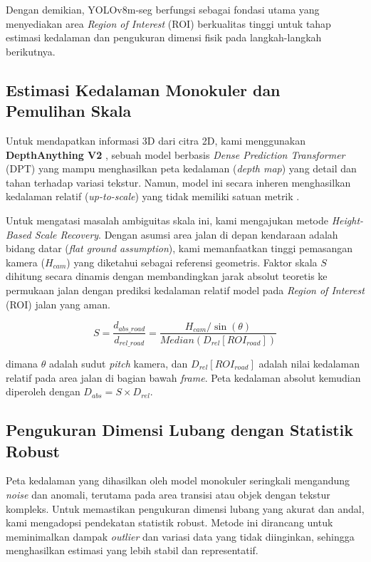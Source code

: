 \documentclass{iopjournal}
\begin{document}
Dengan demikian, YOLOv8m-seg berfungsi sebagai fondasi utama yang menyediakan area \textit{Region of Interest} (ROI) berkualitas tinggi untuk tahap estimasi kedalaman dan pengukuran dimensi fisik pada langkah-langkah berikutnya.

\subsection{Estimasi Kedalaman Monokuler dan Pemulihan Skala}
Untuk mendapatkan informasi 3D dari citra 2D, kami menggunakan \textbf{DepthAnything V2} \cite{depthanything2024}, sebuah model berbasis \textit{Dense Prediction Transformer} (DPT) yang mampu menghasilkan peta kedalaman (\textit{depth map}) yang detail dan tahan terhadap variasi tekstur. Namun, model ini secara inheren menghasilkan kedalaman relatif (\textit{up-to-scale}) yang tidak memiliki satuan metrik \cite{florea2025}.

Untuk mengatasi masalah ambiguitas skala ini, kami mengajukan metode \textit{Height-Based Scale Recovery}. Dengan asumsi area jalan di depan kendaraan adalah bidang datar (\textit{flat ground assumption}), kami memanfaatkan tinggi pemasangan kamera ($H_{cam}$) yang diketahui sebagai referensi geometris. Faktor skala $S$ dihitung secara dinamis dengan membandingkan jarak absolut teoretis ke permukaan jalan dengan prediksi kedalaman relatif model pada \textit{Region of Interest} (ROI) jalan yang aman.

\begin{equation}
S = \frac{d_{abs\_road}}{d_{rel\_road}} = \frac{H_{cam} / \sin(\theta)}{Median(D_{rel}[ROI_{road}])}
\end{equation}

dimana $\theta$ adalah sudut \textit{pitch} kamera, dan $D_{rel}[ROI_{road}]$ adalah nilai kedalaman relatif pada area jalan di bagian bawah \textit{frame}. Peta kedalaman absolut kemudian diperoleh dengan $D_{abs} = S \times D_{rel}$.

\subsection{Pengukuran Dimensi Lubang dengan Statistik Robust}
Peta kedalaman yang dihasilkan oleh model monokuler seringkali mengandung \textit{noise} dan anomali, terutama pada area transisi atau objek dengan tekstur kompleks. Untuk memastikan pengukuran dimensi lubang yang akurat dan andal, kami mengadopsi pendekatan statistik robust. Metode ini dirancang untuk meminimalkan dampak \textit{outlier} dan variasi data yang tidak diinginkan, sehingga menghasilkan estimasi yang lebih stabil dan representatif.
\end{document}

